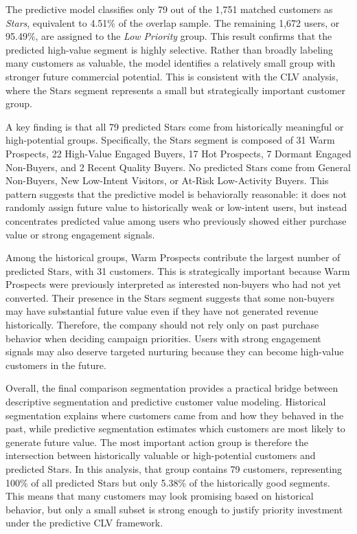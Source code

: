 \documentclass[conference]{IEEEtran}
\begin{document}
The predictive model classifies only 79 out of the 1,751 matched customers as \textit{Stars}, equivalent to 4.51\% of the overlap sample. The remaining 1,672 users, or 95.49\%, are assigned to the \textit{Low Priority} group. This result confirms that the predicted high-value segment is highly selective. Rather than broadly labeling many customers as valuable, the model identifies a relatively small group with stronger future commercial potential. This is consistent with the CLV analysis, where the Stars segment represents a small but strategically important customer group.

A key finding is that all 79 predicted Stars come from historically meaningful or high-potential groups. Specifically, the Stars segment is composed of 31 Warm Prospects, 22 High-Value Engaged Buyers, 17 Hot Prospects, 7 Dormant Engaged Non-Buyers, and 2 Recent Quality Buyers. No predicted Stars come from General Non-Buyers, New Low-Intent Visitors, or At-Risk Low-Activity Buyers. This pattern suggests that the predictive model is behaviorally reasonable: it does not randomly assign future value to historically weak or low-intent users, but instead concentrates predicted value among users who previously showed either purchase value or strong engagement signals.

Among the historical groups, Warm Prospects contribute the largest number of predicted Stars, with 31 customers. This is strategically important because Warm Prospects were previously interpreted as interested non-buyers who had not yet converted. Their presence in the Stars segment suggests that some non-buyers may have substantial future value even if they have not generated revenue historically. Therefore, the company should not rely only on past purchase behavior when deciding campaign priorities. Users with strong engagement signals may also deserve targeted nurturing because they can become high-value customers in the future.

Overall, the final comparison segmentation provides a practical bridge between descriptive segmentation and predictive customer value modeling. Historical segmentation explains where customers came from and how they behaved in the past, while predictive segmentation estimates which customers are most likely to generate future value. The most important action group is therefore the intersection between historically valuable or high-potential customers and predicted Stars. In this analysis, that group contains 79 customers, representing 100\% of all predicted Stars but only 5.38\% of the historically good segments. This means that many customers may look promising based on historical behavior, but only a small subset is strong enough to justify priority investment under the predictive CLV framework.
\end{document}
